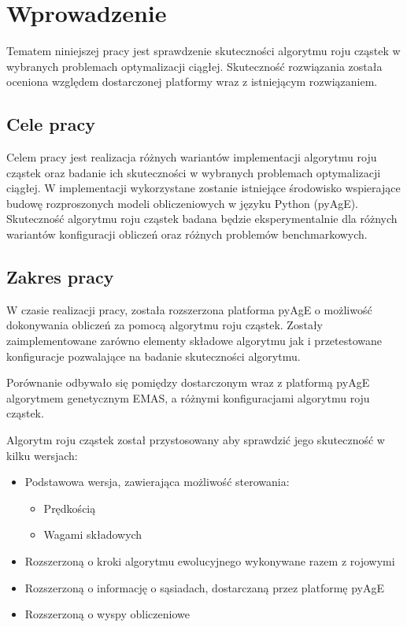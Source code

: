 \chapter{Wprowadzenie}
\label{cha:wstep}


Tematem niniejszej pracy jest sprawdzenie skuteczności algorytmu roju cząstek w wybranych problemach optymalizacji ciągłej. Skuteczność rozwiązania została oceniona względem dostarczonej platformy wraz z istniejącym rozwiązaniem.


\section{Cele pracy}
\label{sec:celePracy}
Celem pracy jest realizacja różnych wariantów implementacji algorytmu roju cząstek oraz badanie ich skuteczności w wybranych problemach optymalizacji ciągłej. W implementacji wykorzystane zostanie istniejące środowisko wspierające budowę rozproszonych modeli obliczeniowych w języku Python (pyAgE). Skuteczność algorytmu roju cząstek badana będzie eksperymentalnie dla różnych wariantów konfiguracji obliczeń oraz różnych problemów benchmarkowych.

\section{Zakres pracy}
W czasie realizacji pracy, została rozszerzona platforma pyAgE o możliwość dokonywania obliczeń za pomocą algorytmu roju cząstek. Zostały zaimplementowane zarówno elementy składowe algorytmu jak i przetestowane konfiguracje pozwalające na badanie skuteczności algorytmu. 

Porównanie odbywało się pomiędzy dostarczonym wraz z platformą pyAgE algorytmem genetycznym EMAS, a różnymi konfiguracjami algorytmu roju cząstek. 

Algorytm roju cząstek został przystosowany aby sprawdzić jego skuteczność w kilku wersjach:
\begin{itemize}
\item Podstawowa wersja, zawierająca możliwość sterowania:
\begin{itemize}
\item Prędkością
\item Wagami składowych
\end{itemize}
\item Rozszerzoną o kroki algorytmu ewolucyjnego wykonywane razem z rojowymi
\item Rozszerzoną o informację o sąsiadach, dostarczaną przez platformę pyAgE
\item Rozszerzoną o wyspy obliczeniowe
\end{itemize}


